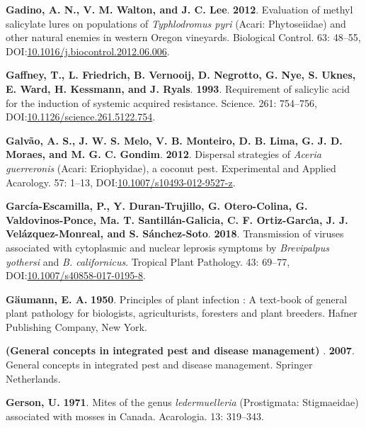 \documentclass[12pt,final,CPage]{ufthesis}
\newlength{\cslhangindent}
\newenvironment{CSLReferences}[2] %
{%
	\setlength{\parindent}{0pt}
	\ifodd #1 \everypar{\setlength{\hangindent}{\cslhangindent}}\ignorespaces\fi
	\ifnum #2 > 0
	\setlength{\parskip}{#2\baselineskip}
	\fi
}%
{}
\begin{document}
{\begin{CSLReferences}{1}{0}
  \leavevmode{}%
  \textbf{Gadino, A. N., V. M. Walton, and J. C. Lee}. \textbf{2012}. Evaluation of methyl salicylate lures on populations of {\emph{Typhlodromus pyri}} {({Acari}: {Phytoseiidae})} and other natural enemies in western {Oregon} vineyards. Biological Control. 63: 48--55, DOI:\href{https://doi.org/10.1016/j.biocontrol.2012.06.006}{10.1016/j.biocontrol.2012.06.006}.

  \leavevmode{}%
  \textbf{Gaffney, T., L. Friedrich, B. Vernooij, D. Negrotto, G. Nye, S. Uknes, E. Ward, H. Kessmann, and J. Ryals}. \textbf{1993}. Requirement of salicylic acid for the induction of systemic acquired resistance. Science. 261: 754--756, DOI:\href{https://doi.org/10.1126/science.261.5122.754}{10.1126/science.261.5122.754}.

  \leavevmode{}%
  \textbf{Galvão, A. S., J. W. S. Melo, V. B. Monteiro, D. B. Lima, G. J. D. Moraes, and M. G. C. Gondim}. \textbf{2012}. Dispersal strategies of {\emph{Aceria guerreronis}} ({Acari}: {Eriophyidae}), a coconut pest. Experimental and Applied Acarology. 57: 1--13, DOI:\href{https://doi.org/10.1007/s10493-012-9527-z}{10.1007/s10493-012-9527-z}.

  \leavevmode{}%
  \textbf{García-Escamilla, P., Y. Duran-Trujillo, G. Otero-Colina, G. Valdovinos-Ponce, Ma. T. Santillán-Galicia, C. F. Ortiz-Garcı́a, J. J. Velázquez-Monreal, and S. Sánchez-Soto}. \textbf{2018}. Transmission of viruses associated with cytoplasmic and nuclear leprosis symptoms by {\emph{Brevipalpus yothersi}} and {\emph{B. californicus}}. Tropical Plant Pathology. 43: 69--77, DOI:\href{https://doi.org/10.1007/s40858-017-0195-8}{10.1007/s40858-017-0195-8}.

  \leavevmode{}%
  \textbf{Gäumann, E. A.} \textbf{1950}. Principles of plant infection : A text-book of general plant pathology for biologists, agriculturists, foresters and plant breeders. Hafner Publishing Company, New York.

  \leavevmode{}%
  \textbf{(General concepts in integrated pest and disease management) }. \textbf{2007}. General concepts in integrated pest and disease management. Springer Netherlands.

  \leavevmode{}%
  \textbf{Gerson, U.} \textbf{1971}. Mites of the genus \emph{ledermuelleria} ({Prostigmata}: {Stigmaeidae}) associated with mosses in {Canada}. Acarologia. 13: 319--343.


\end{CSLReferences}}
\end{document}

